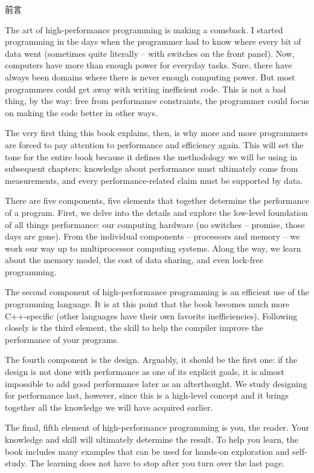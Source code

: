 \begin{flushright}
 前言
\end{flushright}

The art of high-performance programming is making a comeback. I started programming in the days when the programmer had to know where every bit of data went (sometimes quite literally – with switches on the front panel). Now, computers have more than enough power for everyday tasks. Sure, there have always been domains where there is never enough computing power. But most programmers could get away with writing inefficient code. This is not a bad thing, by the way: free from performance constraints, the programmer could focus on making the code better in other ways.

The very first thing this book explains, then, is why more and more programmers are forced to pay attention to performance and efficiency again. This will set the tone for the entire book because it defines the methodology we will be using in subsequent chapters: knowledge about performance must ultimately come from measurements, and every performance-related claim must be supported by data.

There are five components, five elements that together determine the performance of a program. First, we delve into the details and explore the low-level foundation of all things performance: our computing hardware (no switches – promise, those days are gone). From the individual components – processors and memory – we work our way up to multiprocessor computing systems. Along the way, we learn about the memory model, the cost of data sharing, and even lock-free programming.

The second component of high-performance programming is an efficient use of the programming language. It is at this point that the book becomes much more C++-specific (other languages have their own favorite inefficiencies). Following closely is the third element, the skill to help the compiler improve the performance of your programs.

The fourth component is the design. Arguably, it should be the first one: if the design is not done with performance as one of its explicit goals, it is almost impossible to add good performance later as an afterthought. We study designing for performance last, however, since this is a high-level concept and it brings together all the knowledge we will have acquired earlier.

The final, fifth element of high-performance programming is you, the reader. Your knowledge and skill will ultimately determine the result. To help you learn, the book includes many examples that can be used for hands-on exploration and self-study. The learning does not have to stop after you turn over the last page.

